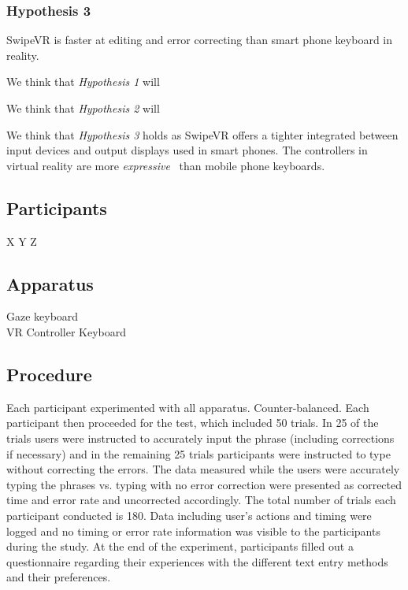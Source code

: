 \documentclass{sigchi}
\begin{document}
\subsubsection{Hypothesis 3}
SwipeVR is faster at editing and error correcting than smart phone keyboard in reality.


We think that \textit{Hypothesis 1} will

We think that \textit{Hypothesis 2} will

We think that \textit{Hypothesis 3} holds as SwipeVR offers a tighter integrated between input devices and output displays used in smart phones.
The controllers in virtual reality are more \textit{expressive}~\cite{card1990design} than mobile phone keyboards.

\subsection{Participants}
X Y Z

\subsection{Apparatus}
Gaze keyboard\\
VR Controller Keyboard

\subsection{Procedure}
Each participant experimented with all apparatus.
Counter-balanced.
Each participant then proceeded for the test, which included 50 trials.
In 25 of the trials users were instructed to accurately input the phrase (including corrections if necessary) and in the remaining 25 trials participants were instructed to type without correcting the errors.
The data measured while the users were accurately typing the phrases vs. typing with no error correction were presented as corrected time and error rate and uncorrected accordingly.
The total number of trials each participant conducted is 180.
Data including user's actions and timing were logged and no timing or error rate information was visible to the participants during the study.
At the end of the experiment, participants filled out a questionnaire regarding their experiences with the different text entry methods and their preferences.
\end{document}
